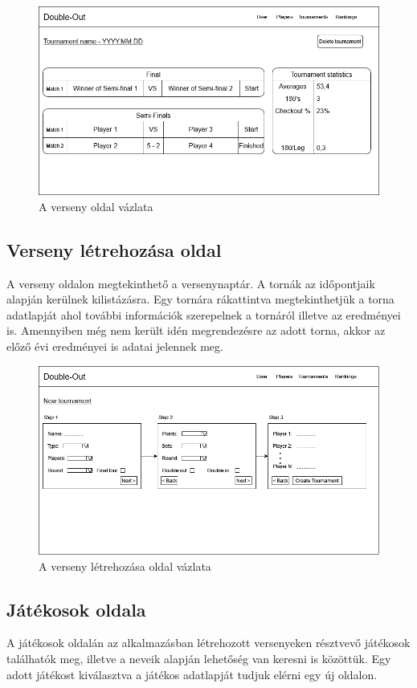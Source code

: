\begin{figure}[h]
\centering
\includegraphics[scale=0.3]{images/TournamentPage.drawio(1).png}
\caption{A verseny oldal vázlata}
\label{fig:cimer}
\end{figure}

\subsection{Verseny létrehozása oldal}
A verseny oldalon megtekinthető a versenynaptár. A tornák az időpontjaik alapján kerülnek kilistázásra. Egy tornára rákattintva megtekinthetjük a torna adatlapját ahol további információk szerepelnek a tornáról illetve az eredményei is. Amennyiben még nem került idén megrendezésre az adott torna, akkor az előző évi eredményei is adatai jelennek meg.

\begin{figure}[h]
\centering
\includegraphics[scale=0.3]{images/CreateTournamentPage.drawio.png}
\caption{A verseny létrehozása oldal vázlata}
\label{fig:cimer}
\end{figure}

\subsection{Játékosok oldala}
A játékosok oldalán az alkalmazásban létrehozott versenyeken résztvevő játékosok találhatók meg, illetve a neveik alapján lehetőség van keresni is közöttük. Egy adott játékost kiválasztva a játékos adatlapját tudjuk elérni egy új oldalon.

